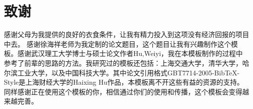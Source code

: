 \section{致谢}
感谢父母为我提供的良好的衣食条件，让我有精力投入到这项没有经济回报的项目中去。
感谢徐海祥老师为我定制的论文题目，这个题目让我有兴趣制作这个模板。感谢武汉理工大学博士与硕士论文作者Hu,Weiyi，我在本模板制作的过程中参考了前辈的思路的方法。我研究过的模板还包括：上海交通大学，清华大学，哈尔滨工业大学，以及中国科技大学。其中论文引用格式GBT7714-2005-BibTeX-Style是上海财经大学的Haixing Hu作品，本模板离不开这些有益的资源的支持。同样感谢正在使用这个模板的你，相信通过你们的使用和传播，这个模板会变得越来越完善。